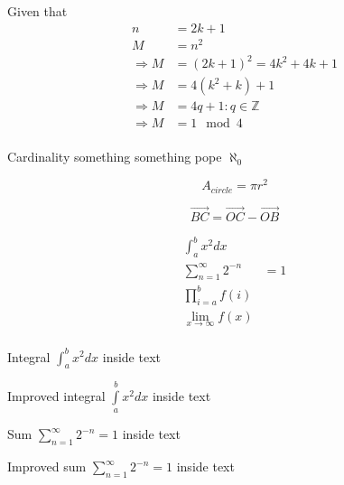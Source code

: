 \documentclass{article}
\begin{document}
Given that
\begin{align*}
    n &= 2k + 1\\
    M &= n^{2}\\
    \Rightarrow M &= (2k + 1)^{2} = 4k^{2} + 4k + 1\\
    \Rightarrow M &= 4(k^{2} + k) + 1\\
    \Rightarrow M &= 4q + 1 : q \in \mathbb{Z}\\
    \Rightarrow M &= 1 \mod 4\\
\end{align*}

Cardinality something something pope $\aleph_0$

\begin{equation*}
    A_{circle} = \pi{}r^{2}
\end{equation*}

\begin{equation*}
    \vec{BC} = \vec{OC} - \vec{OB}
\end{equation*}

\begin{align*}
    \int_{a}^{b} x^2 dx\\
    \sum_{n=1}^{\infty} 2^{-n} &= 1\\
    \prod_{i=a}^{b} f(i)\\
    \lim_{x\to\infty} f(x)\\
\end{align*}

Integral $\int_{a}^{b} x^2 dx$ inside text

Improved integral $\int\limits_{a}^{b} x^2 dx$ inside text

Sum $\sum_{n=1}^{\infty} 2^{-n} = 1$ inside text

Improved sum $\sum\limits_{n=1}^{\infty} 2^{-n} = 1$ inside text 
\end{document}
